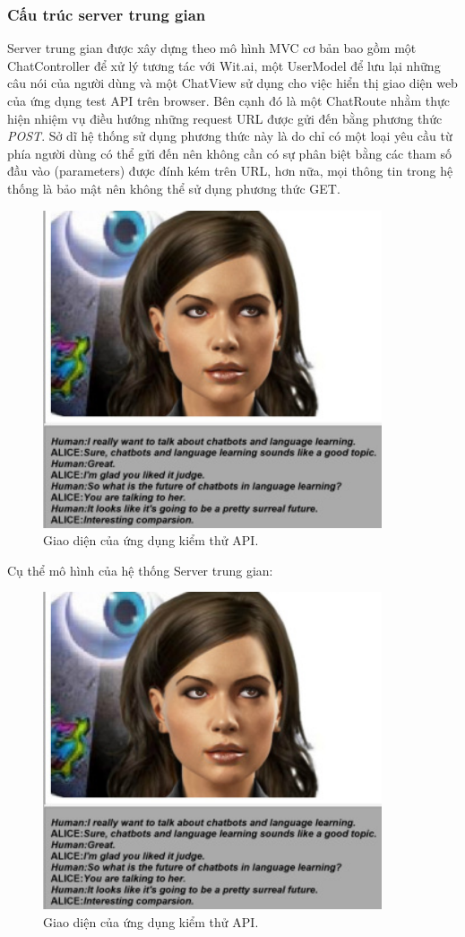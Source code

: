 \documentclass[12pt]{report}
\begin{document}
\subsubsection{Cấu trúc server trung gian}

Server trung gian được xây dựng theo mô hình MVC cơ bản bao gồm một ChatController để xử lý tương tác với Wit.ai, một UserModel để lưu lại những câu nói của người dùng và một ChatView sử dụng cho việc hiển thị giao diện web của ứng dụng test API trên browser. Bên cạnh đó là một ChatRoute nhằm thực hiện nhiệm vụ điều hướng những request URL được gửi đến bằng phương thức \textit{POST}. Sở dĩ hệ thống sử dụng phương thức này là do chỉ có một loại yêu cầu từ phía người dùng có thể gửi đến nên không cần có sự phân biệt bằng các tham số đầu vào (parameters) được đính kém trên URL, hơn nữa, mọi thông tin trong hệ thống là bảo mật nên không thể sử dụng phương thức GET.

\begin{figure}[H]
	\centering
    \includegraphics[width=10cm]{Pics/Chap1/alice.jpg}
  	\caption{Giao diện của ứng dụng kiểm thử API.}
\end{figure}

Cụ thể mô hình của hệ thống Server trung gian:

\begin{figure}[H]
	\centering
    \includegraphics[width=10cm]{Pics/Chap1/alice.jpg}
  	\caption{Giao diện của ứng dụng kiểm thử API.}
\end{figure}
\end{document}
